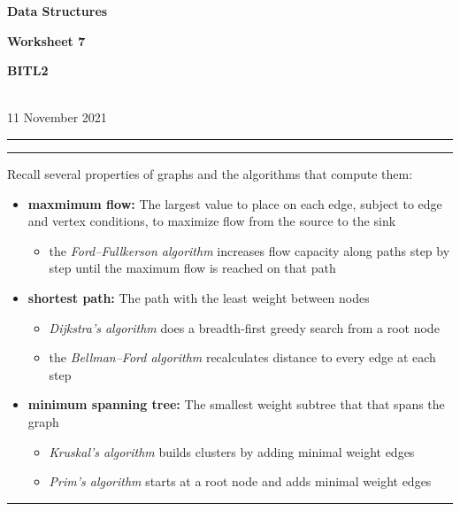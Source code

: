 \documentclass[a4paper,12pt]{article}
\begin{document}
\begin{center}
\parbox{3.5cm}{\textbf{Data Structures}} \hfill {\bf\Huge Worksheet 7} \hfill \parbox{3.5cm}{\flushright\textbf{BITL2}} \\[5pt]
\rm\small 11 November 2021
\end{center}

\hrule\vspace{2pt}\hrule

\vspace{10pt}
\noindent
Recall several properties of graphs and the algorithms that compute them:
\begin{itemize}
\item \textbf{maxmimum flow:} The largest value to place on each edge, subject to edge and vertex conditions, to maximize flow from the source to the sink
\begin{itemize}
\item the \textit{Ford--Fullkerson algorithm} increases flow capacity along paths step by step until the maximum flow is reached on that path
\end{itemize}

\item \textbf{shortest path:} The path with the least weight between nodes
\begin{itemize}
\item \textit{Dijkstra's algorithm} does a breadth-first greedy search from a root node
\item the \textit{Bellman--Ford algorithm} recalculates distance to every edge at each step
\end{itemize}
\item \textbf{minimum spanning tree:} The smallest weight subtree that that spans the graph
\begin{itemize}
\item \textit{Kruskal's algorithm} builds clusters by adding minimal weight edges
\item \textit{Prim's algorithm} starts at a root node and adds minimal weight edges
\end{itemize}
\end{itemize}
\hrule
\end{document}
